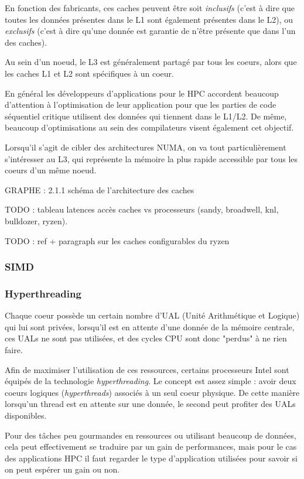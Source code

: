 En fonction des fabricants, ces caches peuvent être soit \emph{inclusifs} (c'est à dire que toutes les données présentes dans le L1 sont également présentes dans le L2), ou \emph{exclusifs} (c'est à dire qu'une donnée est garantie de n'être présente que dans l'un des caches).

Au sein d'un noeud, le L3 est généralement partagé par tous les coeurs, alors que les caches L1 et L2 sont spécifiques à un coeur.

En général les développeurs d'applications pour le HPC accordent beaucoup d'attention à l'optimisation de leur application pour que les parties de code séquentiel critique utilisent des données qui tiennent dans le L1/L2.
De même, beaucoup d'optimisations au sein des compilateurs visent également cet objectif.

Lorsqu'il s'agit de cibler des architectures NUMA, on va tout particulièrement s'intéresser au L3, qui représente la mémoire la plus rapide accessible par tous les coeurs d'un même noeud.

GRAPHE : 2.1.1 schéma de l'architecture des caches

TODO : tableau latences accès caches vs processeurs (sandy, broadwell, knl, bulldozer, ryzen).

TODO : ref + paragraph sur les caches configurables du ryzen

\subsubsection{SIMD}

\subsubsection{Hyperthreading}

Chaque coeur possède un certain nombre d'UAL (Unité Arithmétique et Logique) qui lui sont privées, lorsqu'il est en attente d'une donnée de la mémoire centrale, ces UALs ne sont pas utilisées, et des cycles CPU sont donc "perdus" à ne rien faire.

Afin de maximiser l'utilisation de ces ressources, certains processeurs Intel sont équipés de la technologie \emph{hyperthreading}.
Le concept est assez simple : avoir deux coeurs logiques (\emph{hyperthreads}) associés à un seul coeur physique.
De cette manière lorsqu'un thread est en attente sur une donnée, le second peut profiter des UALs disponibles.

Pour des tâches peu gourmandes en ressources ou utilisant beaucoup de données, cela peut effectivement se traduire par un gain de performances, mais pour le cas des applications HPC il faut regarder le type d'application utilisées pour savoir si on peut espérer un gain ou non.

